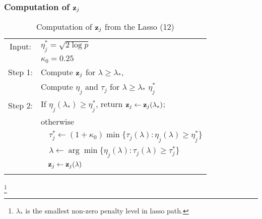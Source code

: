 \begin{frame}
\frametitle{Computation of $\mbox{\bf z}_{j}$}

    \begin{table}%
      \small
      \caption{Computation of $\mbox{\bf z}_j$ from the Lasso (12)}
      \begin{tabular}{cl}
      \toprule
      Input: & $\eta^*_j=\sqrt{2\log p}$ \\
      & $\kappa_0 = 0.25$ \\
      Step 1: & Compute $\mbox{\bf z}_j$ for $\lambda \geq \lambda_*$, \\
      & Compute $\eta_j$ and $\tau_j$ for $\lambda \geq \lambda_*$ $\eta_j^*$ \\
      Step 2: & If $\eta_j(\lambda_*) \geq \eta_j^*$, return $\mbox{\bf z}_j \leftarrow \mbox{\bf z}_j(\lambda_*)$; \\
      & otherwise \\
      & $\quad \tau_j^* \leftarrow (1+\kappa_0)\min\{\tau_j(\lambda):\eta_j(\lambda) \geq \eta_j^*\}$ \\ 
      & $\quad \lambda \leftarrow \arg\min \{ \eta_j(\lambda): \tau_j(\lambda)\geq \tau_j^* \}$ \\
      & $\quad \mbox{\bf z}_j \leftarrow \mbox{\bf z}_j(\lambda)$ \\
      \bottomrule
      \addlinespace
      \end{tabular}
      \footnote{\scriptsize $\lambda_*$ is the smallest non-zero penalty level in lasso path.}
    \end{table}  
  

\end{frame}
